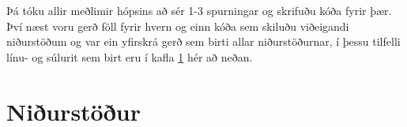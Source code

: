 \documentclass[12pt, git, draft]{rureport}
\begin{document}
Þá tóku allir meðlimir hópsins að sér 1-3 spurningar og skrifuðu kóða fyrir þær. Því næst voru gerð föll fyrir hvern og einn kóða sem skiluðu viðeigandi niðurstöðum og var ein yfirskrá gerð sem birti allar niðurstöðurnar, í þessu tilfelli línu- og súlurit sem birt eru í kafla \ref{nidurstodur} hér að neðan.



 


\section{Niðurstöður}\label{nidurstodur}
\end{document}
